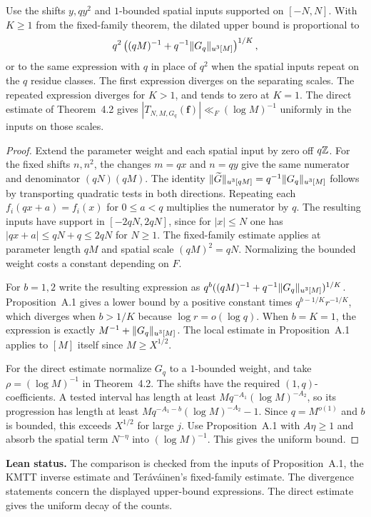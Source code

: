 \begin{lemma}\label{checked-separating-comparison}
\leanok
{}
Use the shifts $y,qy^2$ and $1$-bounded spatial inputs supported
on $[-N,N]$. With $K\ge1$ from the fixed-family theorem, the
dilated upper bound is proportional to
\[
 q^2\left((qM)^{-1}+q^{-1}\lVert G_q\rVert_{u^3[M]}\right)^{1/K},
\]
or to the same expression with $q$ in place of $q^2$ when the
spatial inputs repeat on the $q$ residue classes. The first expression
diverges on the separating scales. The repeated expression diverges
for $K>1$, and tends to zero at $K=1$. The direct estimate of
Theorem~4.2 gives $|T_{N,M,G_q}(\mathbf f)|\ll_F (\log M)^{-1}$
uniformly in the inputs on those scales.
\end{lemma}
\begin{proof}
\leanok
Extend the parameter weight and each spatial input by zero off
$q\mathbb Z$. For the fixed shifts $n,n^2$, the changes $m=qx$ and $n=qy$
give the same numerator and denominator $(qN)(qM)$. The identity
$\lVert\widetilde G\rVert_{u^3[qM]}=q^{-1}\lVert G_q\rVert_{u^3[M]}$ follows
by transporting quadratic tests in both directions.
Repeating each $f_i(qx+a)=f_i(x)$ for $0\le a<q$ multiplies the
numerator by $q$. The resulting inputs have support in
$[-2qN,2qN]$, since for $|x|\le N$ one has
$|qx+a|\le qN+q\le2qN$ for $N\ge1$. The fixed-family estimate
applies at parameter length $qM$ and spatial scale $(qM)^2=qN$.
Normalizing the bounded weight costs a constant depending on $F$.

For $b=1,2$ write the resulting expression as
$q^b((qM)^{-1}+q^{-1}\lVert G_q\rVert_{u^3[M]})^{1/K}$.
Proposition~A.1 gives a lower bound by a positive constant times
$q^{b-1/K}r^{-1/K}$, which diverges when $b>1/K$ because
$\log r=o(\log q)$. When $b=K=1$, the expression is exactly
$M^{-1}+\lVert G_q\rVert_{u^3[M]}$. The local estimate in
Proposition~A.1 applies to $[M]$ itself since $M\ge X^{1/2}$.

For the direct estimate normalize $G_q$ to a $1$-bounded
weight, and take $\rho=(\log M)^{-1}$ in Theorem~4.2.
The shifts have the required $(1,q)$-coefficients.
A tested interval has length at least
$Mq^{-A_1}(\log M)^{-A_2}$, so its progression has length at least
$Mq^{-A_1-b}(\log M)^{-A_2}-1$. Since $q=M^{o(1)}$ and $b$ is
bounded, this exceeds $X^{1/2}$ for large $j$.
Use Proposition~A.1 with $A\eta\ge1$ and absorb the spatial
term $N^{-\eta}$ into $(\log M)^{-1}$. This gives the uniform bound.
\end{proof}
\noindent\textbf{Lean status.} The comparison is checked from
the inputs of Proposition~A.1, the KMTT inverse estimate and
Ter\'av\'ainen's fixed-family estimate. The divergence statements
concern the displayed upper-bound expressions. The direct
estimate gives the uniform decay of the counts.


